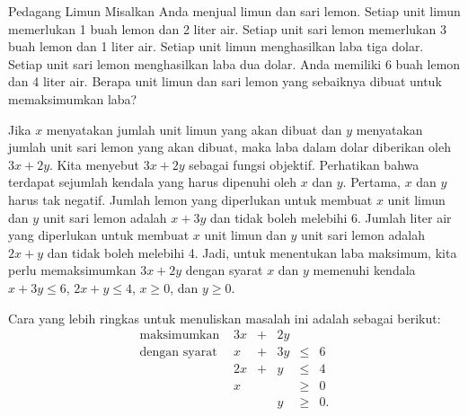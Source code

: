\begin{example}{Pedagang Limun}\label{exa:lemonadevendor}
Misalkan Anda menjual limun dan sari lemon. Setiap unit limun
memerlukan 1 buah lemon dan 2 liter air. Setiap unit sari lemon
memerlukan 3 buah lemon dan 1 liter air. Setiap unit limun menghasilkan
laba tiga dolar. Setiap unit sari lemon menghasilkan laba dua
dolar. Anda memiliki 6 buah lemon dan 4 liter air. Berapa unit
limun dan sari lemon yang sebaiknya dibuat untuk memaksimumkan laba?

Jika \(x\) menyatakan jumlah unit limun yang akan dibuat dan
\(y\) menyatakan jumlah unit sari lemon yang akan dibuat, maka
laba dalam dolar diberikan oleh \(3x + 2y\). Kita menyebut \(3x + 2y\)
sebagai fungsi objektif. Perhatikan bahwa terdapat sejumlah kendala yang
harus dipenuhi oleh \(x\) dan \(y\). Pertama, \(x\) dan \(y\) harus
tak negatif. Jumlah lemon yang diperlukan untuk membuat \(x\) unit limun
dan \(y\) unit sari lemon adalah \(x+3y\) dan tidak boleh melebihi 6.
Jumlah liter air yang diperlukan untuk membuat \(x\) unit limun dan
\(y\) unit sari lemon adalah \(2x+y\) dan tidak boleh melebihi 4. Jadi,
untuk menentukan laba maksimum, kita perlu memaksimumkan \(3x + 2y\)
dengan syarat \(x\) dan \(y\) memenuhi kendala \(x + 3y \leq 6\),
\(2x + y \leq 4\), \(x \geq 0\), dan \(y \geq 0.\)

Cara yang lebih ringkas untuk menuliskan masalah ini adalah sebagai berikut:
\[\begin{array}{rrcrll}
\text{maksimumkan } & 3x & + & 2y & \\
\text{dengan syarat}
& x & + & 3y & \leq & 6 \\
& 2x & +&  y & \leq & 4 \\
& x &  & & \geq & 0 \\
& & & y & \geq & 0. \\
\end{array}\]

\end{example}
